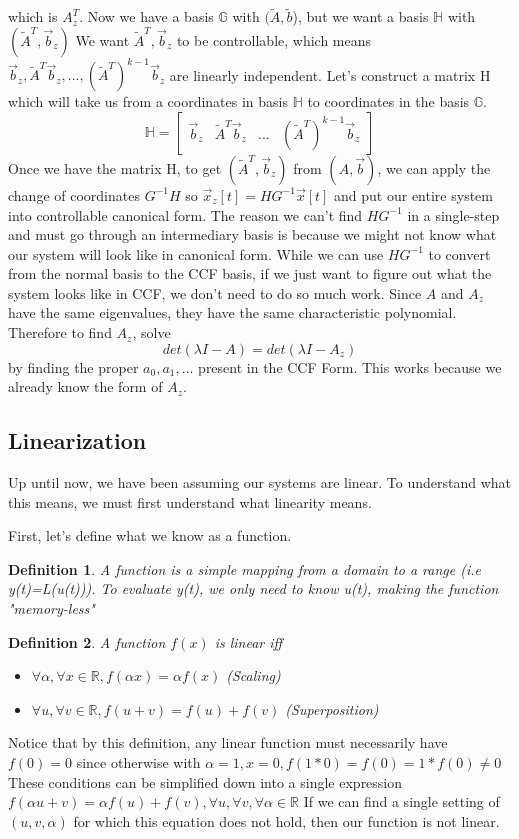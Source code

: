 \documentclass{article}
\newtheorem{definition}{Definition}
\begin{document}
which is $A_z^T$. Now we have a basis $\mathbb{G}$ with $(\tilde{A}, \tilde{b}$), but we want a basis $\mathbb{H}$ with $(\tilde{A}^T, \vec{b}_z)$
We want $\tilde{A}^T, \vec{b}_z$ to be controllable, which means $\vec{b}_z, \tilde{A}^T\vec{b}_z,...,(\tilde{A}^T)^{k-1}\vec{b}_z$ are linearly independent.
Let's construct a matrix H which will take us from a coordinates in basis $\mathbb{H}$ to coordinates in the basis $\mathbb{G}$. 
\[
    \mathbb{H} = \left[
        \begin{array}{c|c|c|c}
            \vec{b}_z & \tilde{A}^T\vec{b}_z & ... &(\tilde{A}^T)^{k-1}\vec{b}_z
        \end{array}
    \right]
\]
Once we have the matrix H, to get $(\tilde{A}^T, \vec{b}_z)$ from $(A, \vec{b})$,
we can apply the change of coordinates $G^{-1}H$ so $\vec{x}_z[t]=HG^{-1}\vec{x}[t]$ and put our entire system into controllable canonical form.
The reason we can't find $HG^{-1}$ in a single-step and must go through an intermediary basis is because we might not know what our system will look like in canonical form.
While we can use $HG^{-1}$ to convert from the normal basis to the CCF basis, if we just want to figure out what the system looks like in CCF, we don't need to do so much work.
Since $A$ and $A_z$ have the same eigenvalues, they have the same characteristic polynomial. Therefore to find $A_z$, solve
$$det(\lambda I - A) = det(\lambda I - A_z)$$
by finding the proper $a_0, a_1, ...$ present in the CCF Form. This works because we already know the form of $A_z$.
\subsection{Linearization}
Up until now, we have been assuming our systems are linear. To understand what this means, we must first understand what linearity means.

First, let's define what we know as a function.
\begin{definition}
    A function is a simple mapping from a domain to a range (i.e y(t)=L(u(t))). 
    To evaluate y(t), we only need to know u(t), making the function "memory-less"
\end{definition}
\begin{definition}
    A function $f(x)$ is linear iff
    \begin{itemize}
        \item $\forall \alpha, \forall x \in \mathbb{R}, f(\alpha x) = \alpha f(x)$ (Scaling)
        \item $\forall u, \forall v \in \mathbb{R}, f(u + v) = f(u)+f(v)$ (Superposition)
    \end{itemize}
\end{definition}
Notice that by this definition, any linear function must necessarily have $f(0)=0$ since otherwise with $\alpha = 1, x=0, f(1*0)=f(0)=1*f(0)\ne 0$
These conditions can be simplified down into a single expression $f(\alpha u + v) = \alpha f(u) + f(v), \forall u, \forall v, \forall \alpha \in \mathbb{R}$
If we can find a single setting of $(u, v, \alpha)$ for which this equation does not hold, then our function is not linear.
\end{document}
